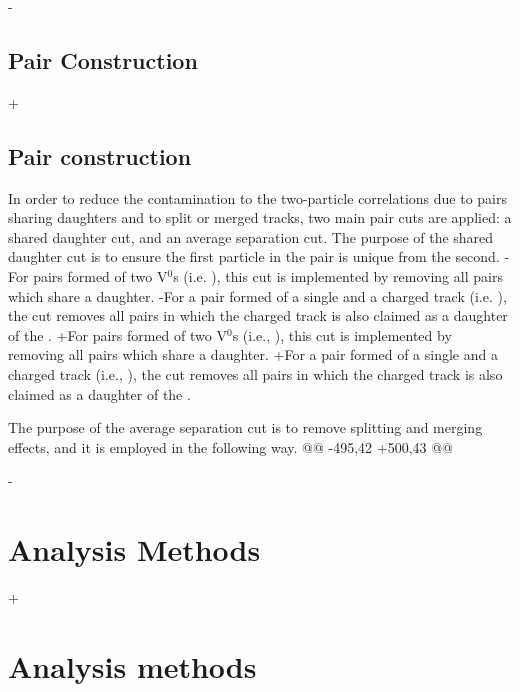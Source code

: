  
-\subsection{Pair Construction}
+\subsection{Pair construction}
 \label{PairConstruction}
 
 In order to reduce the contamination to the two-particle correlations due to pairs sharing daughters and to split or merged tracks, two main pair cuts are applied: a shared daughter cut, and an average separation cut.
 The purpose of the shared daughter cut is to ensure the first particle in the pair is unique from the second.  
-For pairs formed of two V$^{0}$s (i.e. \LamKs), this cut is implemented by removing all pairs which share a daughter.  
-For a pair formed of a single \Vz and a charged track (i.e. \LamKpm), the cut removes all pairs in which the charged track is also claimed as a daughter of the \Vz.  
+For pairs formed of two V$^{0}$s (i.e., \LamKs), this cut is implemented by removing all pairs which share a daughter.  
+For a pair formed of a single \Vz and a charged track (i.e., \LamKpm), the cut removes all pairs in which the charged track is also claimed as a daughter of the \Vz.  
 
 
 The purpose of the average separation cut is to remove splitting and merging effects, and it is employed in the following way.  
@@ -495,42 +500,43 @@
 
-\section{Analysis Methods}
+\section{Analysis methods}
 \label{sec:AnalysisMethods}
 

